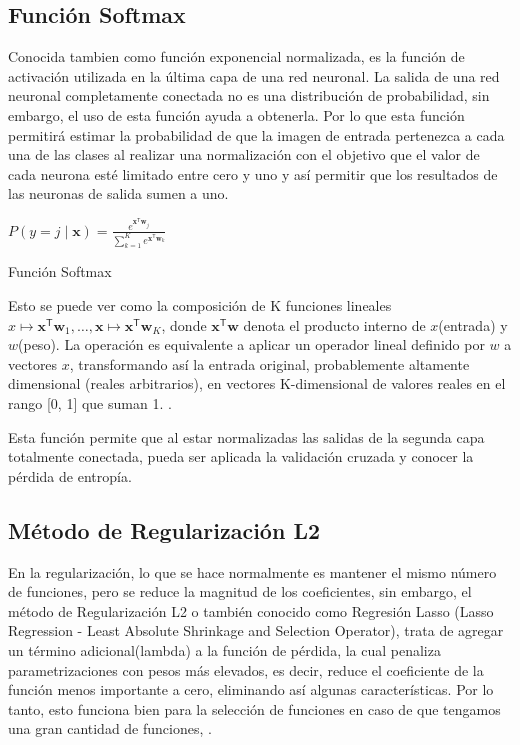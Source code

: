	\subsection{Función Softmax}
		Conocida tambien como función exponencial normalizada, es la función de activación utilizada en la última capa de una red neuronal. La salida de una red neuronal completamente conectada no es una distribución de probabilidad, sin embargo, el uso de esta función ayuda a obtenerla. Por lo que esta función permitirá estimar la probabilidad de que la imagen de entrada pertenezca a cada una de las clases al realizar una normalización con el objetivo que el valor de cada neurona esté limitado entre cero y uno y así permitir que los resultados de las neuronas de salida sumen a uno. 

			\begingroup\makeatletter{}\check@mathfonts
			\begin{center}
			${\displaystyle P(y=j\mid \mathbf {x} )={\frac {e^{\mathbf {x} ^{\mathsf {T}}\mathbf {w} _{j}}}{\sum _{k=1}^{K}e^{\mathbf {x} ^{\mathsf {T}}\mathbf {w} _{k}}}}}$
			\end{center}
			\begin{center}
			{\small{Función Softmax}}
			\end{center}
			\endgroup
			
		Esto se puede ver como la composición de K funciones lineales ${x} \mapsto \mathbf {x} ^{\mathsf {T}}\mathbf {w} _{1},\ldots ,\mathbf {x} \mapsto \mathbf {x} ^{\mathsf {T}}\mathbf {w} _{K}$, donde ${\mathbf {x} ^{\mathsf {T}}\mathbf {w}}$ denota el producto interno de $x$(entrada) y $w$(peso).	La operación es equivalente a aplicar un operador lineal definido por $ w $ a vectores $ x $, transformando así la entrada original, probablemente altamente dimensional (reales arbitrarios), en vectores K-dimensional de valores reales en el rango [0, 1] que suman 1. \citep{Bishop}. 

		Esta función permite que al estar normalizadas las salidas de la segunda capa totalmente conectada, pueda ser aplicada la validación cruzada y conocer la pérdida de entropía.

	
	\subsection{Método de Regularización L2}
		En la regularización, lo que se hace normalmente es mantener el mismo número de funciones, pero se reduce la magnitud de los coeficientes, sin embargo, el método de Regularización L2 o también conocido como Regresión Lasso (Lasso Regression - Least Absolute Shrinkage and Selection Operator), trata de agregar un término adicional(lambda) a la función de pérdida, la cual penaliza parametrizaciones con pesos más elevados, es decir, reduce el coeficiente de la función menos importante a cero, eliminando así algunas características. Por lo tanto, esto funciona bien para la selección de funciones en caso de que tengamos una gran cantidad de funciones, \citep{AulaMLP}.

